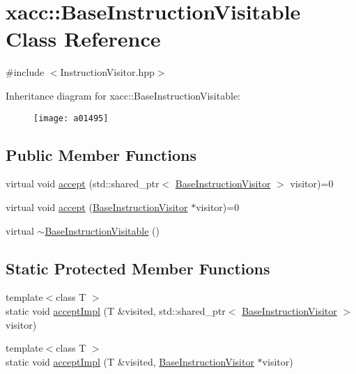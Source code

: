 \hypertarget{a01495}{}\section{xacc\+:\+:Base\+Instruction\+Visitable Class Reference}
\label{a01495}


{\ttfamily \#include $<$Instruction\+Visitor.\+hpp$>$}

Inheritance diagram for xacc\+:\+:Base\+Instruction\+Visitable\+:\begin{figure}[H]
\begin{center}
\leavevmode
\texttt{[image: a01495]}
\end{center}
\end{figure}
\subsection*{Public Member Functions}
\begin{DoxyCompactItemize}
\item 
virtual void \hyperlink{a01495_a4ae295a7f83d57c6f1f912adc90274ea}{accept} (std\+::shared\+\_\+ptr$<$ \hyperlink{a01487}{Base\+Instruction\+Visitor} $>$ visitor)=0
\item 
virtual void \hyperlink{a01495_ad6b9ad95c14580cc86ca87cd464262c3}{accept} (\hyperlink{a01487}{Base\+Instruction\+Visitor} $\ast$visitor)=0
\item 
virtual \hyperlink{a01495_a3a291d247b18ea7620dd8d97dfb595f4}{$\sim$\+Base\+Instruction\+Visitable} ()
\end{DoxyCompactItemize}
\subsection*{Static Protected Member Functions}
\begin{DoxyCompactItemize}
\item 
{\footnotesize template$<$class T $>$ }\\static void \hyperlink{a01495_a2f18b9fcb48f42d190a9f5180b7b59c5}{accept\+Impl} (T \&visited, std\+::shared\+\_\+ptr$<$ \hyperlink{a01487}{Base\+Instruction\+Visitor} $>$ visitor)
\item 
{\footnotesize template$<$class T $>$ }\\static void \hyperlink{a01495_a80c7bb995faa54644f822fa48176c6cb}{accept\+Impl} (T \&visited, \hyperlink{a01487}{Base\+Instruction\+Visitor} $\ast$visitor)
\end{DoxyCompactItemize}


